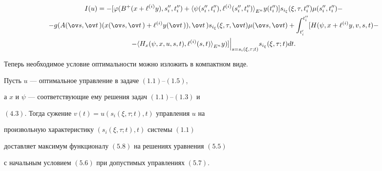 \begin{multline}


I(u) = - [ \varphi (B^{+}(x + \ell^{(i)}y), s''_i,t''_i) +


{\la \psi(s''_i,t''_i), \ell^{(i)} (s''_i,t''_i) \ra}_{E^n}


y(t''_i) ]s_{i_{\xi}} (\xi,\tau, t''_i)\mu (s''_i,t''_i) - \\


%


-g(A(\ov s,\ov t\,)(x(\ov s,\ov t\,) + \ell^{(i)}


y(\ov t\,)), \ov t\,)


s_{i_{\xi}} (\xi,\tau,\ov t) \mu (\ov s,\ov t) +


\int_{t_{i}'}^{t_{i}''} [


H(\psi, x + \ell^{(i)}y,v,s,t) - \\


%


-{\la H_{x}(\psi,x,u,s,t),


\ell^{(i)}(s,t) \ra}_{E^n}y) ]


\Big|_{s = s_{i}(\xi, \tau; t)}


s_{i_{\xi}}(\xi, \tau; t) dt.


\end{multline}





Теперь необходимое условие оптимальности можно изложить в компактном виде.





\begin{thm}


Пусть $u$ --- оптимальное управление в задаче $(1.1)$--$(1.5)$,


а $x$ и $\psi$ --- соответствующие ему решения задач $(1.1)$--$(1.3)$ и


$(4.3)$. Тогда сужение $v(t) = u(s_i (\xi, \tau; t), t)$ управления $u$ на


произвольную характеристику $(s_i (\xi, \tau; t), t)$ системы $(1.1)$


доставляет максимум функционалу $(5.8)$ на решениях уравнения $(5.5)$


с начальным условием $(5.6)$ при допустимых управлениях $(5.7)$.


\end{thm}





